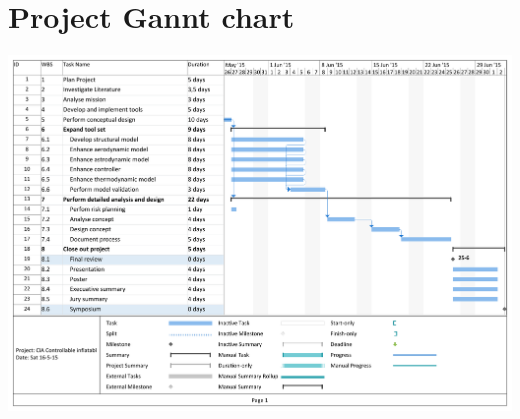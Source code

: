 \section{Project Gannt chart} \label{app:gantt}

\label{fig:GanttChart}
\includegraphics[angle=90,origin=c,width=0.9\linewidth]{Figure/GanttChartV3.pdf}
